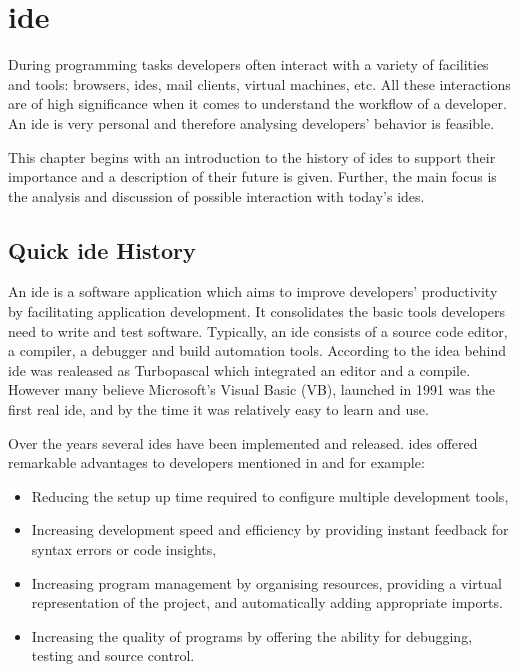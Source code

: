 \chapter{\gls{ide}}\label{cha:IDEs}

During programming tasks developers often interact with a variety of facilities and tools: browsers, \gls{ide}s, mail clients, virtual machines, etc. All these interactions are of high significance when it comes to understand the workflow of a developer. An \gls{ide} is very personal and therefore analysing developers' behavior is feasible. 

This chapter begins with an introduction to the history of \gls{ide}s to support their importance and a description of their future is given. Further, the main focus is the analysis and discussion of possible interaction with today's \gls{ide}s.

\section{Quick \gls{ide} History}

An \gls{ide} is a software application which aims to improve developers' productivity by facilitating application development. It consolidates the basic tools developers need to write and test software. Typically, an \gls{ide} consists of a source code editor, a compiler, a debugger and build automation tools. According to  
the idea behind \gls{ide} was realeased as Turbopascal which integrated an editor and a compile. However many believe Microsoft's Visual Basic (VB), launched in 1991 was the first real \gls{ide}, and by the time it was relatively easy to learn and use.

Over the years several \gls{ide}s have been implemented and released. \gls{ide}s offered remarkable advantages to developers mentioned in 
and  for example: %
\begin{itemize}
\item Reducing the setup up time required to configure multiple development tools, 
\item Increasing development speed and efficiency by providing instant feedback for syntax errors or code insights,
\item Increasing program management by organising resources, providing a virtual representation of the project, and automatically adding appropriate imports. 
\item Increasing the quality of programs by offering the ability for debugging, testing and source control.
\end{itemize}


